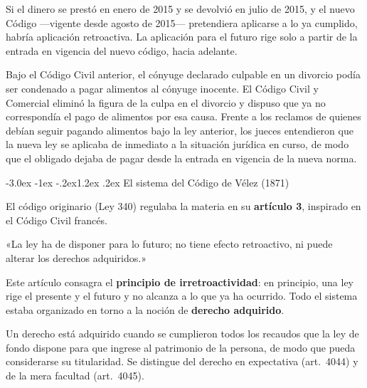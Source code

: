 \documentclass[12pt,oneside]{book}
\makeatletter
\renewcommand\section{\@startsection{section}{1}{\z@}%
  {-3.0ex \@plus -1ex \@minus -.2ex}{1.2ex \@plus .2ex}%
  {\normalfont\large\bfseries\color{acento}}}
\makeatother
\begin{document}
\begin{ejemplo}
Si el dinero se prestó en enero de 2015 y se devolvió en julio de 2015, y el nuevo Código ---vigente desde agosto de 2015--- pretendiera aplicarse a lo ya cumplido, habría aplicación retroactiva. La aplicación para el futuro rige solo a partir de la entrada en vigencia del nuevo código, hacia adelante.
\end{ejemplo}

\begin{ejemplo}
Bajo el Código Civil anterior, el cónyuge declarado culpable en un divorcio podía ser condenado a pagar alimentos al cónyuge inocente. El Código Civil y Comercial eliminó la figura de la culpa en el divorcio y dispuso que ya no correspondía el pago de alimentos por esa causa. Frente a los reclamos de quienes debían seguir pagando alimentos bajo la ley anterior, los jueces entendieron que la nueva ley se aplicaba de inmediato a la situación jurídica en curso, de modo que el obligado dejaba de pagar desde la entrada en vigencia de la nueva norma.
\end{ejemplo}

\section{El sistema del Código de Vélez (1871)}

El código originario (Ley 340) regulaba la materia en su \textbf{artículo 3}, inspirado en el Código Civil francés.

\begin{regla}
«La ley ha de disponer para lo futuro; no tiene efecto retroactivo, ni puede alterar los derechos adquiridos.»
\end{regla}

Este artículo consagra el \textbf{principio de irretroactividad}: en principio, una ley rige el presente y el futuro y no alcanza a lo que ya ha ocurrido. Todo el sistema estaba organizado en torno a la noción de \textbf{derecho adquirido}.

\begin{definicion}
Un derecho está adquirido cuando se cumplieron todos los recaudos que la ley de fondo dispone para que ingrese al patrimonio de la persona, de modo que pueda considerarse su titularidad. Se distingue del derecho en expectativa (art.~4044) y de la mera facultad (art.~4045).
\end{definicion}
\end{document}
